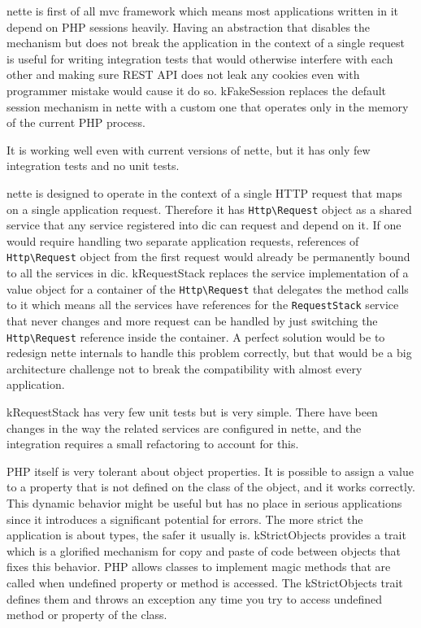 \label{sec:state:fake-session}

\gls{nette} is first of all \gls{mvc} framework which means most applications written in it depend on PHP sessions heavily. Having an abstraction that disables the mechanism but does not break the application in the context of a single request is useful for writing integration tests that would otherwise interfere with each other and making sure REST API does not leak any cookies even with programmer mistake would cause it do so. \gls{kFakeSession} replaces the default session mechanism in \gls{nette} with a custom one that operates only in the memory of the current PHP process.

It is working well even with current versions of \gls{nette}, but it has only few integration tests and no unit tests.

 \label{sec:state:request-stack}

\gls{nette} is designed to operate in the context of a single HTTP request that maps on a single application request. Therefore it has \lstinline{Http\Request} object as a shared service that any service registered into \gls{dic} can request and depend on it. If one would require handling two separate application requests, references of \lstinline{Http\Request} object from the first request would already be permanently bound to all the services in \gls{dic}. \gls{kRequestStack} replaces the service implementation of a value object for a container of the \lstinline{Http\Request} that delegates the method calls to it which means all the services have references for the \lstinline{RequestStack} service that never changes and more request can be handled by just switching the \lstinline{Http\Request} reference inside the container. A perfect solution would be to redesign \gls{nette} internals to handle this problem correctly, but that would be a big architecture challenge not to break the compatibility with almost every application.

\gls{kRequestStack} has very few unit tests but is very simple. There have been changes in the way the related services are configured in \gls{nette}, and the integration requires a small refactoring to account for this.

 \label{sec:state:strict-objects}

PHP itself is very tolerant about object properties. It is possible to assign a value to a property that is not defined on the class of the object, and it works correctly. This dynamic behavior might be useful but has no place in serious applications since it introduces a significant potential for errors. The more strict the application is about types, the safer it usually is. \gls{kStrictObjects} provides a trait which is a glorified mechanism for copy and paste of code between objects that fixes this behavior. PHP allows classes to implement magic methods that are called when undefined property or method is accessed. The \gls{kStrictObjects} trait defines them and throws an exception any time you try to access undefined method or property of the class.

